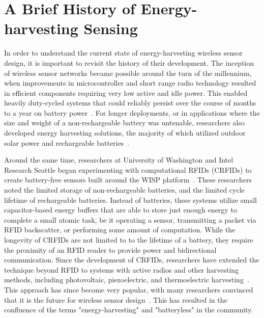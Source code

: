 \section{A Brief History of Energy-harvesting Sensing}
In order to understand the current state of energy-harvesting wireless sensor design, it is important to revisit the history of their development. The inception of wireless sensor networks became possible around the turn of the millennium, when improvements in microcontroller and short range radio technology resulted in efficient components requiring very low active and idle power. This enabled heavily duty-cycled systems that could reliably persist over the course of months to a year on battery power~\cite{mainwaring2002wireless,tolle2005macroscope}. 
For longer deployments, or in applications where the size and weight of a non-rechargeable battery was untenable, researchers also developed energy harvesting solutions, the majority of which utilized outdoor solar power and rechargeable batteries~\cite{juang2002energy,raghunathan2005design}.

Around the same time, researchers at University of Washington and Intel Research Seattle began experimenting with computational RFIDs (CRFIDs) to create battery-free sensors built around the WISP platform~\cite{sample2008design}. 
These researchers noted the limited storage of non-rechargeable batteries, and the limited cycle lifetime of rechargeable batteries. 
Instead of batteries, these systems utilize small capacitor-based energy buffers that are able to store just enough energy to complete a small atomic task, be it operating a sensor, transmitting a packet via RFID backscatter, or performing some amount of computation. 
While the longevity of CRFIDs are not limited to to the lifetime of a battery, they require the proximity of an RFID reader to provide power and bidirectional communication. 
Since the development of CRFIDs, researchers have extended the technique beyond RFID to systems with active radios and other harvesting methods, including photovoltaic, piezoelectric, and thermoelectric harvesting~\cite{yervaGrafting12, debruin2013monjolo, hesterFlicker17, colinReconfigurable18, nardello2019camaroptera}. This approach has since become very popular, with many researchers convinced that it is the future for wireless sensor design~\cite{hester2017future}. This has resulted in the confluence of the terms "energy-harvesting" and "batteryless" in the community. 


